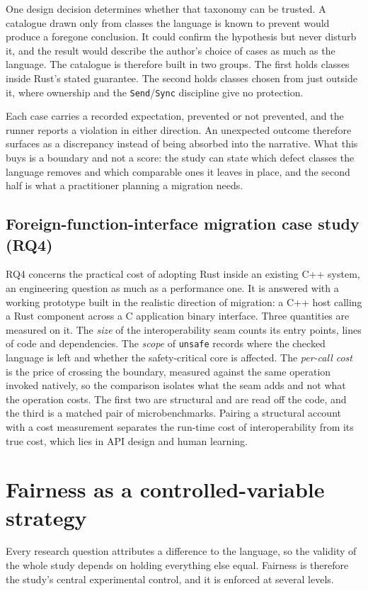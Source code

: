 \documentclass[english,twoside,openright,a4paper,censored,csm,software-track-2020]{HYthesisML}
\begin{document}
One design decision determines whether that taxonomy can be trusted. A catalogue drawn only from
classes the language is known to prevent would produce a foregone conclusion. It could confirm
the hypothesis but never disturb it, and the result would describe the author's choice of cases
as much as the language. The catalogue is therefore built in two groups. The first holds classes
inside Rust's stated guarantee. The second holds classes chosen from just outside it, where
ownership and the \texttt{Send}/\texttt{Sync} discipline give no protection.

Each case carries a recorded expectation, prevented or not prevented, and the runner reports a
violation in either direction. An unexpected outcome therefore surfaces as a discrepancy instead
of being absorbed into the narrative. What this buys is a boundary and not a score: the study
can state which defect classes the language removes and which comparable ones it leaves in
place, and the second half is what a practitioner planning a migration needs.

\subsection{Foreign-function-interface migration case study (RQ4)}\label{sec:methodffi}
RQ4 concerns the practical cost of adopting Rust inside an existing C++ system, an engineering
question as much as a performance one. It is answered with a working prototype built in the
realistic direction of migration: a C++ host calling a Rust component across a C application
binary interface. Three quantities are measured on it. The \emph{size} of the interoperability
seam counts its entry points, lines of code and dependencies. The \emph{scope} of
\texttt{unsafe} records where the checked language is left and whether the safety-critical core
is affected. The \emph{per-call cost} is the price of crossing the boundary, measured against
the same operation invoked natively, so the comparison isolates what the seam adds and not what
the operation costs. The first two are structural and are read off the code, and the third is a
matched pair of microbenchmarks. Pairing a structural account with a cost measurement separates
the run-time cost of interoperability from its true cost, which lies in API design and human
learning.

\section{Fairness as a controlled-variable strategy}\label{sec:controls}
Every research question attributes a difference to the language, so the validity of the whole
study depends on holding everything else equal. Fairness is therefore the study's central
experimental control, and it is enforced at several levels.
\end{document}
